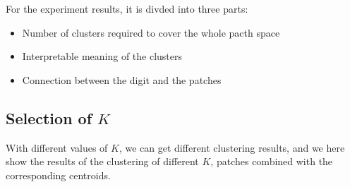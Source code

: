 \documentclass{article}
\begin{document}
\quad

For the experiment results, it is divded into three parts:

\begin{itemize}
    \item Number of clusters required to cover the whole pacth space
    \item Interpretable meaning of the clusters
    \item Connection between the digit and the patches
\end{itemize}

\subsection{Selection of $K$}

With different values of $K$, we can get different clustering results, and we here show the results of the clustering of different $K$, patches combined with the corresponding centroids.
\end{document}
